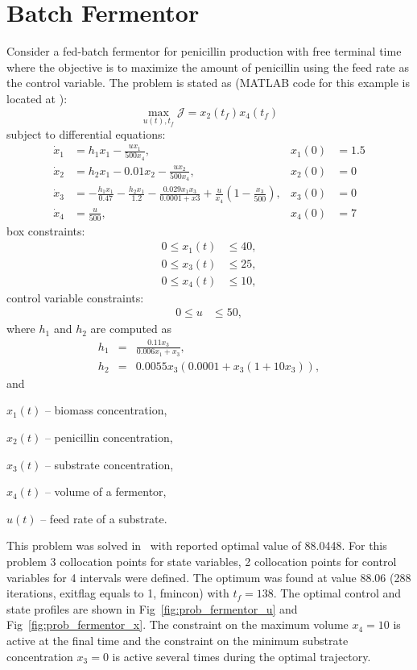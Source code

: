 \section{Batch Fermentor}
\label{sec:prob_fermentor}
Consider a fed-batch fermentor for penicillin production with free
terminal time~\citep{ban05} where the objective is to maximize the
amount of penicillin using the feed rate as the control variable. The
problem is stated as (MATLAB code for this example is located at
): 
\begin{equation}
\max_{u(t),t_f} \mathcal{J} = x_{2}(t_{f})x_{4}(t_{f})
\end{equation}
subject to differential equations:
\begin{align}
\dot{x}_1 & = 
h_1x_1-\frac{u x_1}{500 x_4}, &
x_1(0) &= 1.5  \\
\dot{x}_2 & = 
h_2x_1-0.01x_2-\frac{ux_2}{500x_4}, &
x_2(0) &= 0  \\
\dot{x}_3 &=
-\frac{h_1x_1}{0.47}-\frac{h_2x_1}{1.2}-\frac{0.029x_1x_3}{0.0001+x3}
  +\frac{u}{x_4} \left( 1-\frac{x_3}{500} \right),
&
x_3(0) &= 0 \\ 
\dot{x}_4 &= \frac{u}{500}, &
x_4(0) &= 7
\end{align}
box constraints:
\begin{align}
0 \le x_1(t) &\le 40, \\
0 \le x_3(t) &\le 25, \\
0 \le x_4(t) &\le 10, 
\end{align}
control variable constraints:
\begin{align}
0 \le u &\le 50, 
\end{align}
where $h_1$ and $h_2$ are computed as
\begin{eqnarray} 
h_1 &=& \frac{0.11x_3}{0.006x_1+x_3}, \\
h_2 &=& 0.0055x_3(0.0001+x_3(1+10x_3)),
\end{eqnarray}
and 
\begin{description}
	\item $x_1(t)$ -- biomass concentration,
	\item $x_2(t)$ -- penicillin concentration,
	\item $x_3(t)$ -- substrate concentration,
	\item $x_4(t)$ -- volume of a fermentor,
	\item $u(t)$ -- feed rate of a substrate.
\end{description}

This problem was solved in~\citep{rut10} with reported optimal value
of 88.0448. For this problem 3 collocation points for state variables,
2 collocation points for control variables for 4 intervals were
defined. The optimum was found at value 88.06 (288 iterations,
exitflag equals to 1, fmincon) with $t_f = 138$. The optimal control
and state profiles are shown in Fig~\ref{fig:prob_fermentor_u} and
Fig~\ref{fig:prob_fermentor_x}. The constraint on the maximum volume
$x_4=10$ is active at the final time and the constraint on the minimum
substrate concentration $x_3=0$ is active several times during the
optimal trajectory.

